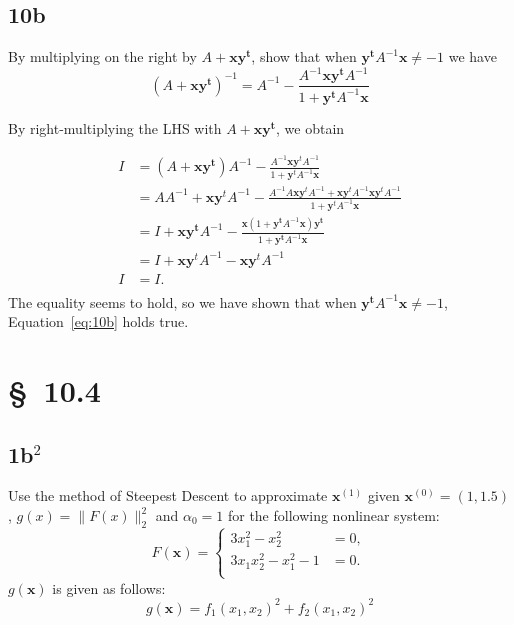 \documentclass[12pt]{article}
\begin{document}
\newpage
\subsection{10b}
By multiplying on the right by $A + \mathbf{x y^{t}}$, show that when
$\mathbf{y^{t}} A^{-1} \mathbf{x} \ne -1$ we have
\begin{equation}
  \label{eq:10b}
  (A+\mathbf{x y^{t}})^{-1} = A^{-1} - \frac{A^{-1} \mathbf{x y^{t}} A^{-1}}{1+\mathbf{y^{t}}A^{-1}\mathbf{x}}
\end{equation}

By right-multiplying the LHS with $A + \mathbf{x y^{t}}$, we obtain 

\begin{align*}
I &= (A+\mathbf{x y^t}) A^{-1} - \frac{A^{-1} \mathbf{x} \mathbf{y}^{t} A^{-1}}{1+\mathbf{y}^{t}A^{-1}\mathbf{x}}\\
&= AA^{-1}+\mathbf{x}\mathbf{y}^t A^{-1}-\frac{A^{-1}A \mathbf{x} \mathbf{y}^{t} A^{-1}+\mathbf{x} \mathbf{y}^{t}A^{-1}\mathbf{x} \mathbf{y}^{t}A^{-1}}{1+\mathbf{y}^{t}A^{-1}\mathbf{x}}\\
&=I+\mathbf{x y^t} A^{-1}-\frac{\mathbf{x}(1+\mathbf{y^{t}}A^{-1}\mathbf{x})\mathbf{y^{t}}}{1+\mathbf{y^{t}}A^{-1}\mathbf{x}}\\
&=I+\mathbf{x} \mathbf{y}^{t}A^{-1}-\mathbf{x} \mathbf{y}^{t}A^{-1}\\
I&= I.\\
\end{align*}
The equality seems to hold, so we have shown that when $\mathbf{y^{t}} A^{-1} \mathbf{x} \ne -1$, Equation~\ref{eq:10b} holds true.\\
\section{\S~10.4}
\subsection{1b$^2$}
Use the method of Steepest Descent to approximate $\mathbf{x}^{(1)}$
given $\mathbf{x}^{(0)}=(1,1.5)$, $g(x)=\|F(x)\|_2^2$ and $\alpha_0=1$
for the following nonlinear system:
\begin{equation*}
  \label{eq:stp_F}
  F(\mathbf{x}) = \left\{
    \begin{aligned}
      3x_1^2-x_2^2&=0, \\
      3x_1x_2^2-x_1^2-1&=0. \\
    \end{aligned}
  \right.
\end{equation*}
$g(\mathbf{x})$ is given as follows:
\begin{equation}
  \label{eq:stp_g}
  g(\mathbf{x}) = f_1(x_1,x_2)^2+f_2(x_1,x_2)^2
\end{equation}
\end{document}
